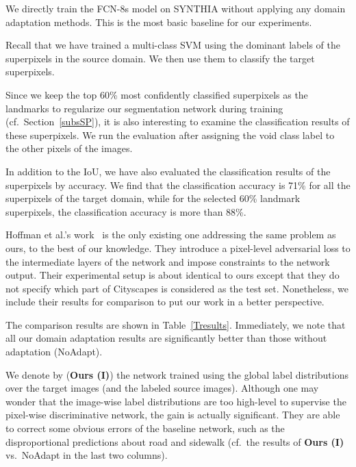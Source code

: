 \begin{description}
  \setlength\itemsep{0.01in}

\item[No adaptation (NoAdapt).] We directly train the FCN-8s model on SYNTHIA without applying any domain adaptation methods. This is the most basic baseline for our experiments. 

\item[Superpixel classification (SP).]\label{baselineSP} Recall that we have trained a multi-class SVM using the dominant labels of the superpixels in the source domain. We then use them to classify the target superpixels. 

\item[Landmark superpixels (SP Lndmk).] Since we keep the top 60\% most confidently classified superpixels  as the landmarks to regularize our segmentation network during training (cf.\ Section~\ref{subsSP}), it is also interesting to examine the classification results of these superpixels. We run the evaluation after assigning the void class label to the other pixels of the images. 

In addition to the IoU, we have also evaluated the classification results of the superpixels by accuracy. We find that the classification accuracy is 71\% for all the superpixels of the target domain, while for the selected 60\% landmark superpixels, the classification accuracy is more than 88\%. 



\item[FCNs in the wild (FCN Wld).] Hoffman et al.'s work~\textbf{\cite{hoffman_fcns_2016}} is the only existing one addressing the same problem as ours, to the best of our knowledge. They introduce a pixel-level adversarial loss to the intermediate layers of the network and impose constraints to the network output. Their experimental setup is about identical to ours except that they do not specify which part of Cityscapes is considered as the test set. Nonetheless, we include their results for comparison to put our work in a better perspective. 



\end{description}


The comparison results are shown in Table~\ref{Tresults}. Immediately, we note that all our domain adaptation results are significantly better than those without adaptation (NoAdapt). 

We denote by (\textbf{Ours (I)}) the network trained using the global label distributions over the target images (and the labeled source images). Although one may wonder that the image-wise label distributions are too high-level to supervise the pixel-wise discriminative network, the gain is actually significant. They are able to correct some obvious errors of the baseline network, such as the disproportional predictions about road and sidewalk (cf.\ the results of \textbf{Ours (I)} vs.\ NoAdapt in the last two columns).



